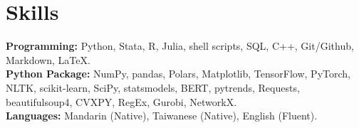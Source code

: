 \documentclass{academicThemeCV}
\begin{document}
\section{Skills}
  \vspace{1pt}
  \resumeSubHeadingListStart
    \vspace{-5pt}
    \small{\item{
        \textbf{Programming: }{Python, Stata, R, Julia, shell scripts,
        SQL, C++, Git/Github, Markdown, \LaTeX.} \\[3pt]
        \textbf{Python Package: }{
          NumPy, pandas, Polars, Matplotlib, TensorFlow, PyTorch, NLTK, scikit-learn, SciPy, statsmodels,
        BERT, pytrends, Requests, beautifulsoup4, CVXPY, RegEx, 
        Gurobi, NetworkX.} \\[3pt]
      \textbf{Languages: }{Mandarin (Native), Taiwanese (Native), English (Fluent).}
        
    }}
  \resumeSubHeadingListEnd



\end{document}
